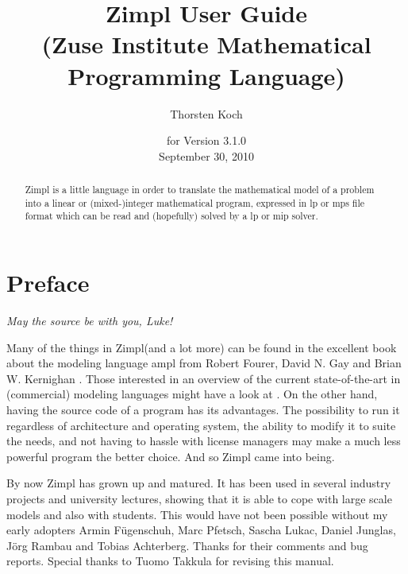 \documentclass[11pt]{article}
\newcommand{\zimpl}{{\sc Zimpl}\xspace}
\newcommand{\lp}{{\sc lp}\xspace}
\newcommand{\mip}{{\sc mip}\xspace}
\newcommand{\mps}{{\sc mps}\xspace}
\newcommand{\lpf}{{\sc lp}\xspace}
\newcommand{\ampl}{{\sc ampl}\xspace}
\begin{document}

\title{
\LARGE\zimpl User Guide\\
\normalsize (Zuse Institute Mathematical Programming Language)}
\author{Thorsten Koch}
\date{\small for Version 3.1.0\\ September 30, 2010}
\maketitle
%
\tableofcontents
\newpage
\begin{abstract}
  \zimpl is a little language in order to translate the mathematical
  model of a problem into a linear or (mixed-)integer mathematical
  program, expressed in \lpf or \mps file format which can be read and
  (hopefully) solved by a \lp or \mip solver.
\end{abstract}


\section{Preface}
\begin{flushright}
{\em May the source be with you, Luke!}
\end{flushright}
Many of the things in \zimpl (and a lot more) can be found in 
the excellent book about the modeling language \ampl 
from Robert Fourer, David N. Gay and Brian W. Kernighan
\cite{FourierGayKernighan2003}. Those interested in an overview of the
current state-of-the-art in (commercial) modeling languages might have
a look at \cite{Kallrath2004}.
%
On the other hand, having the source code of a program has its
advantages. The possibility to run it regardless of architecture and
operating system, the ability to modify it to suite the needs, and not
having to hassle with license managers may make a much less powerful
program the better choice.  And so \zimpl came into being.

\bigskip
By now \zimpl has grown up and matured. It has been used in several
industry projects and university lectures, showing that it is able to
cope with large scale models and also with students.
This would have not been possible without my early adopters 
Armin F\"ugenschuh, Marc Pfetsch, Sascha Lukac, Daniel Junglas, J\"org
Rambau and Tobias Achterberg. Thanks for their comments and bug
reports. Special thanks to Tuomo Takkula for revising this manual.
\end{document}
